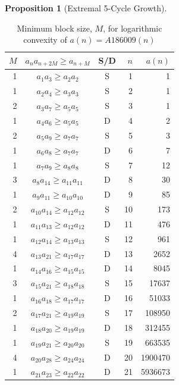 \documentclass[12pt, oneside]{article}
\numberwithin{equation}{section}
\theoremstyle{definition}
\newtheorem{proposition}{Proposition}[section]
\theoremstyle{plain}
\theoremstyle{remark}
\begin{document}
\begin{proposition}[Extremal 5-Cycle Growth]
\begin{table}[htbp]
\centering
\caption{Minimum block size, $M$, for logarithmic convexity of $a(n) = A186009(n)$}
\label{tab:A186009}
\vspace{4pt}
\begin{tabular}{@{}rccrr@{}}
\toprule
$M$ & $a_{n} a_{n+2M} \ge a_{n+M}$ & {S/D} & $n$ & $a(n)$ \\
\midrule
1 & $a_{ 1} a_{ 3} \ge a_{ 2} a_{ 2}$ & S &  1 &            1 \\
1 & $a_{ 2} a_{ 4} \ge a_{ 3} a_{ 3}$ & S &  2 &            1 \\
2 & $a_{ 3} a_{ 7} \ge a_{ 5} a_{ 5}$ & S &  3 &            1 \\
1 & $a_{ 4} a_{ 6} \ge a_{ 5} a_{ 5}$ & D &  4 &            2 \\
2 & $a_{ 5} a_{ 9} \ge a_{ 7} a_{ 7}$ & S &  5 &            3 \\
1 & $a_{ 6} a_{ 8} \ge a_{ 7} a_{ 7}$ & D &  6 &            7 \\
1 & $a_{ 7} a_{ 9} \ge a_{ 8} a_{ 8}$ & S &  7 &           12 \\
3 & $a_{ 8} a_{14} \ge a_{11} a_{11}$ & D &  8 &           30 \\
1 & $a_{ 9} a_{11} \ge a_{10} a_{10}$ & D &  9 &           85 \\
2 & $a_{10} a_{14} \ge a_{12} a_{12}$ & S & 10 &          173 \\
1 & $a_{11} a_{13} \ge a_{12} a_{12}$ & D & 11 &          476 \\
1 & $a_{12} a_{14} \ge a_{13} a_{13}$ & S & 12 &          961 \\
4 & $a_{13} a_{21} \ge a_{17} a_{17}$ & D & 13 &         2652 \\
1 & $a_{14} a_{16} \ge a_{15} a_{15}$ & D & 14 &         8045 \\
3 & $a_{15} a_{21} \ge a_{18} a_{18}$ & S & 15 &        17637 \\
1 & $a_{16} a_{18} \ge a_{17} a_{17}$ & D & 16 &        51033 \\
2 & $a_{17} a_{21} \ge a_{19} a_{19}$ & S & 17 &       108950 \\
1 & $a_{18} a_{20} \ge a_{19} a_{19}$ & D & 18 &       312455 \\
1 & $a_{19} a_{21} \ge a_{20} a_{20}$ & S & 19 &       663535 \\
4 & $a_{20} a_{28} \ge a_{24} a_{24}$ & D & 20 &      1900470 \\
1 & $a_{21} a_{23} \ge a_{22} a_{22}$ & D & 21 &      5936673 \\

\end{tabular}
\end{table}
\end{proposition}
\end{document}
